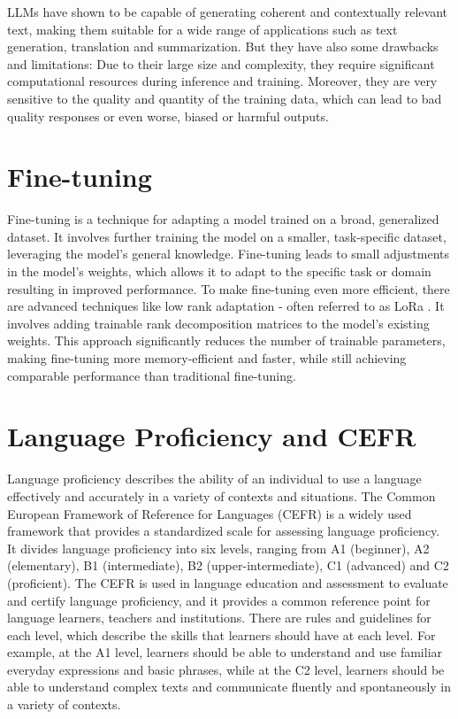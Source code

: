 LLMs have shown to be capable of generating coherent and contextually relevant text, making them suitable for a wide range of applications such as text generation, translation and summarization. But they have also some drawbacks and limitations: Due to their large size and complexity, they require significant computational resources during inference and training. Moreover, they are very sensitive to the quality and quantity of the training data, which can lead to bad quality responses or even worse, biased or harmful outputs.

\section{Fine-tuning}
\label{s:background_finetuning}
Fine-tuning is a technique for adapting a model trained on a broad, generalized dataset. It involves further training the model on a smaller, task-specific dataset, leveraging the model's general knowledge. Fine-tuning leads to small adjustments in the model's weights, which allows it to adapt to the specific task or domain resulting in improved performance. To make fine-tuning even more efficient, there are advanced techniques like low rank adaptation - often referred to as LoRa \citep{Hu2021}. It involves adding trainable rank decomposition matrices to the model's existing weights. This approach significantly reduces the number of trainable parameters, making fine-tuning more memory-efficient and faster, while still achieving comparable performance than traditional fine-tuning.

\section{Language Proficiency and CEFR}
\label{s:background_cefr}
Language proficiency describes the ability of an individual to use a language effectively and accurately in a variety of contexts and situations. The Common European Framework of Reference for Languages (CEFR) is a widely used framework that provides a standardized scale for assessing language proficiency. It divides language proficiency into six levels, ranging from A1 (beginner), A2 (elementary), B1 (intermediate), B2 (upper-intermediate), C1 (advanced) and C2 (proficient). The CEFR is used in language education and assessment to evaluate and certify language proficiency, and it provides a common reference point for language learners, teachers and institutions. There are rules and guidelines for each level, which describe the skills that learners should have at each level. For example, at the A1 level, learners should be able to understand and use familiar everyday expressions and basic phrases, while at the C2 level, learners should be able to understand complex texts and communicate fluently and spontaneously in a variety of contexts.
